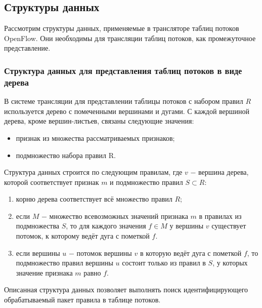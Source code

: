 \documentclass[oneside,final,12pt]{extarticle}
\begin{document}
        \subsection {Структуры данных}
            Рассмотрим структуры данных, применяемые в трансляторе таблиц потоков OpenFlow. 
            Они необходимы для трансляции таблиц потоков, как промежуточное представление.

            \subsubsection {Структура данных для представления таблиц потоков в виде дерева}
                В системе трансляции для представлении таблицы потоков с набором правил \(R\) используется дерево с помеченными вершинами и дугами.
                С каждой вершиной дерева, кроме вершин-листьев, связаны следующие значения:
                \begin{itemize}
                    \item признак из множества рассматриваемых признаков;
                    \item подмножество набора правил R.
                \end{itemize}

                Структура данных строится по следующим правилам, где \(v\) $-$ вершина дерева, которой соответствует признак \(m\) и подмножество правил \(S \subset R\):
                \begin{enumerate}
                    \item корню дерева соответствует всё множество правил \(R\);
                    \item если \(M\) $-$ множество всевозможных значений признака \(m\) в правилах из подмножества \(S\), то для каждого значения \(f \in M\)
                        у вершины \(v\) существует потомок, к которому ведёт дуга с пометкой \(f\).
                    \item если вершины \(u\) $-$ потомок вершины \(v\) в которую ведёт дуга с пометкой \(f\), то подмножество правил вершины \(u\) состоит только из
                        правил в \(S\), у которых значение признака \(m\) равно \(f\).
                \end{enumerate}

                Описанная структура данных позволяет выполнять поиск идентифицирующего обрабатываемый пакет правила в таблице потоков.
\end{document}
